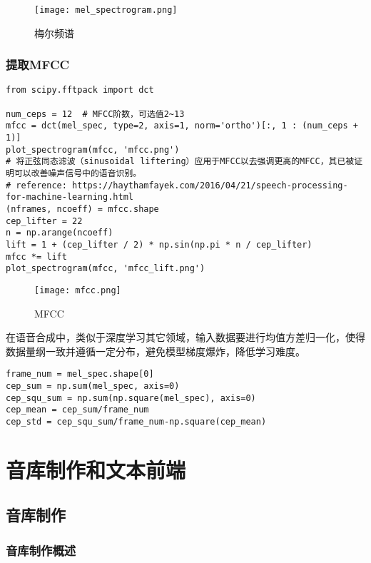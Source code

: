 \documentclass[cn,10pt,math=newtx,citestyle=gb7714-2015,bibstyle=gb7714-2015]{elegantbook}
\begin{document}
\begin{figure}[htbp]
  \centering
  \texttt{[image: mel\_spectrogram.png]}
  \caption{梅尔频谱 \label{fig:mel_spectrogram}}
\end{figure}

\subsection{提取MFCC}

\begin{lstlisting}
from scipy.fftpack import dct

num_ceps = 12  # MFCC阶数，可选值2~13
mfcc = dct(mel_spec, type=2, axis=1, norm='ortho')[:, 1 : (num_ceps + 1)]
plot_spectrogram(mfcc, 'mfcc.png')
# 将正弦同态滤波（sinusoidal liftering）应用于MFCC以去强调更高的MFCC，其已被证明可以改善噪声信号中的语音识别。
# reference: https://haythamfayek.com/2016/04/21/speech-processing-for-machine-learning.html
(nframes, ncoeff) = mfcc.shape
cep_lifter = 22
n = np.arange(ncoeff)
lift = 1 + (cep_lifter / 2) * np.sin(np.pi * n / cep_lifter)
mfcc *= lift
plot_spectrogram(mfcc, 'mfcc_lift.png')
\end{lstlisting}

\begin{figure}[htbp]
  \centering
  \texttt{[image: mfcc.png]}
  \caption{MFCC \label{fig:mfcc}}
\end{figure}

在语音合成中，类似于深度学习其它领域，输入数据要进行均值方差归一化，使得数据量纲一致并遵循一定分布，避免模型梯度爆炸，降低学习难度。

\begin{lstlisting}
frame_num = mel_spec.shape[0]
cep_sum = np.sum(mel_spec, axis=0)
cep_squ_sum = np.sum(np.square(mel_spec), axis=0)
cep_mean = cep_sum/frame_num
cep_std = cep_squ_sum/frame_num-np.square(cep_mean)
\end{lstlisting}


\chapter{音库制作和文本前端}

\section{音库制作}

\subsection{音库制作概述}
\end{document}
